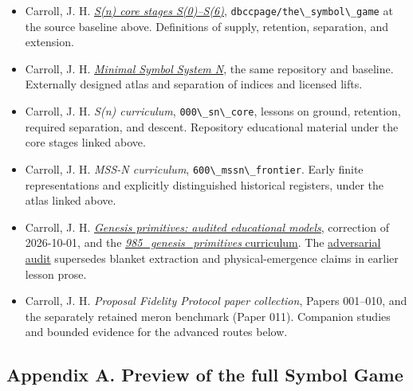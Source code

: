 \documentclass[
  11pt,
]{article}
\newcommand{\passthrough}[1]{#1}
\providecommand{\tightlist}{%
  \setlength{\itemsep}{0pt}\setlength{\parskip}{0pt}}
\begin{document}
\begin{itemize}
\tightlist
\item
  Carroll, J. H.
  \href{https://github.com/dbccpage/the_symbol_game/tree/3f3399766108adc4c4e7615dce2573a57be57dd6/education/documentation/0_s_n/core}{\emph{S(n)
  core stages S(0)--S(6)}},
  \passthrough{\lstinline!dbccpage/the\_symbol\_game!} at the source
  baseline above. Definitions of supply, retention, separation, and
  extension.
\item
  Carroll, J. H.
  \href{https://github.com/dbccpage/the_symbol_game/tree/3f3399766108adc4c4e7615dce2573a57be57dd6/education/documentation/1_minimal_symbol_system_n_mssn}{\emph{Minimal
  Symbol System N}}, the same repository and baseline. Externally
  designed atlas and separation of indices and licensed lifts.
\item
  Carroll, J. H. \emph{S(n) curriculum},
  \passthrough{\lstinline!000\_sn\_core!}, lessons on ground, retention,
  required separation, and descent. Repository educational material
  under the core stages linked above.
\item
  Carroll, J. H. \emph{MSS-N curriculum},
  \passthrough{\lstinline!600\_mssn\_frontier!}. Early finite
  representations and explicitly distinguished historical registers,
  under the atlas linked above.
\item
  Carroll, J. H.
  \href{https://github.com/dbccpage/the_symbol_game/blob/3f3399766108adc4c4e7615dce2573a57be57dd6/education/documentation/2_genesis/primitives/README.md}{\emph{Genesis
  primitives: audited educational models}}, correction of 2026-10-01,
  and the
  \href{https://github.com/dbccpage/the_symbol_game/tree/3f3399766108adc4c4e7615dce2573a57be57dd6/education/documentation/2_genesis/curriculum/985_genesis_primitives}{\emph{985\_genesis\_primitives}
  curriculum}. The
  \href{https://github.com/dbccpage/the_symbol_game/blob/3f3399766108adc4c4e7615dce2573a57be57dd6/education/documentation/2_genesis/adversarial_verification/README.md}{adversarial
  audit} supersedes blanket extraction and physical-emergence claims in
  earlier lesson prose.
\item
  Carroll, J. H. \emph{Proposal Fidelity Protocol paper collection},
  Papers 001--010, and the separately retained meron benchmark (Paper
  011). Companion studies and bounded evidence for the advanced routes
  below.
\end{itemize}

\subsection{Appendix A. Preview of the full Symbol
Game}\label{appendix-a.-preview-of-the-full-symbol-game}
\end{document}
